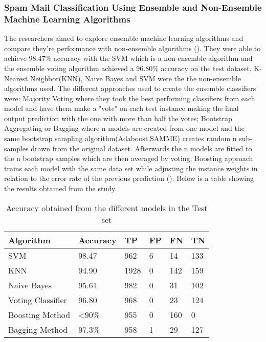 \subsubsection{Spam Mail Classification Using Ensemble and Non-Ensemble Machine Learning Algorithms}
The researchers aimed to explore ensemble machine learning algorithms and compare they're performance with non-ensemble algorithms (\cite{agarwal_uniyal_virendrasingh_krishna_dutt_2020}). They were able to achieve 98.47\% accuracy with the SVM which is a non-ensemble algorithm and the ensemble voting algorithm achieved a 96.80\% accuracy on the test dataset.  K-Nearest Neighbor(KNN), Naive Bayes and SVM were the the non-ensemble algorithms used. The different approaches used to create the ensemble classifiers were: Majority Voting where they took the best performing classifiers from each model and have them make a "vote" on each test instance making the final output prediction with the one with more than half the votes; Bootstrap Aggregating or Bagging where n models are created from one model and the same bootstrap sampling algorithm(Adaboost.SAMME) creates random n sub-samples drawn from the original dataset. Afterwards the n models are fitted to the n bootstrap samples which are then averaged by voting; Boosting approach trains each model with the same data set while adjusting the instance weights in relation to the error rate of the previous prediction (\cite{agarwal_uniyal_virendrasingh_krishna_dutt_2020}).
Below is a table showing the results obtained from the study.
\begin{table}[H]
    \centering
    \begin{tabular}{|p{4cm}|p{2cm}|p{2cm}|p{2cm}|p{2cm}|p{2cm}|}
        \hline
        Algorithm & Accuracy & TP & FP & FN & TN\\
        \hline
        SVM & 98.47 & 962 & 6 & 14 & 133\\
        \hline
        KNN & 94.90 & 1928 & 0 & 142 & 159\\
        \hline
        Naive Bayes & 95.61 & 982 & 0 & 31 & 102\\
        \hline
        Voting Classifier & 96.80 & 968 & 0 & 23 & 124\\
        \hline
        Boosting Method & <90\% & 955 & 0 & 160 & 0\\
        \hline
        Bagging Method & 97.3\% & 958 & 1 & 29 & 127\\
        \hline
    \end{tabular}
    \caption{Accuracy obtained from the different models in the Test set}
    \label{tab:ensemble}
\end{table}